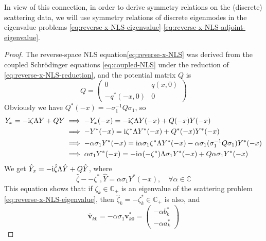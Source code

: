 In view of this connection, in order to derive symmetry relations on the (discrete) scattering data, we will use symmetry relations of discrete eigenmodes in the eigenvalue problems \eqref{eq:reverse-x-NLS-eigenvalue}-\eqref{eq:reverse-x-NLS-adjoint-eigenvalue}.
\begin{proof}
    The reverse-space NLS equation\eqref{eq:reverse-x-NLS} was derived from the coupled Schrödinger equations \eqref{eq:coupled-NLS} under the reduction of \eqref{eq:reverse-x-NLS-reduction}, and the potential matrix $ Q $ is 
    \begin{equation}
        Q = \begin{pmatrix}
            0 & q(x,0) \\
            -q^{*}(-x,0) & 0
        \end{pmatrix}
    \end{equation}
    Obviously we have $ Q^{*}(-x) = - \sigma^{-1}_{1} Q \sigma_{1} $, so
    \begin{equation}
        \begin{aligned}
            Y_{x} = - \mathrm{i} \zeta \Lambda Y + QY &\implies -Y_{x}(-x) = -\mathrm{i} \zeta \Lambda Y(-x) + Q(-x)Y(-x) \\
            &\implies -Y^{*}(-x) = \mathrm{i} \zeta^{*} \Lambda Y^{*}(-x) + Q^{*}(-x)Y^{*}(-x) \\
            &\implies - \alpha \sigma_{1}Y^{*}(-x) = \mathrm{i} \alpha \sigma_{1} \zeta^{*} \Lambda Y^{*}(-x) - \alpha \sigma_{1} (\sigma_{1}^{-1}Q\sigma_{1})Y^{*}(-x) \\ 
            &\implies \alpha \sigma_{1}Y^{*}(-x) = - \mathrm{i} \alpha (-\zeta^{*}) \Lambda \sigma_{1}Y^{*}(-x) + Q \alpha \sigma_{1}Y^{*}(-x) \\
        \end{aligned}
    \end{equation}
    We get $ \hat{Y}_{x} = - \mathrm{i} \hat{\zeta}\Lambda \hat{Y} + Q \hat{Y} $, where
    \begin{equation}
        \hat{\zeta} - - \zeta^{*}, \hat{Y} = \alpha \sigma_{1}Y^{*}(-x) , \quad \forall \alpha \in \mathbb{C} 
    \end{equation}
    This equation shows that: if $ \zeta_{k} \in \mathbb{C}_{+} $ is an eigenvalue of the scattering problem \eqref{eq:reverse-x-NLS-eigenvalue}, then $ \hat{\zeta}_{k} = - \zeta_{k}^{*} \in \mathbb{C}_{+} $ is also, and 
    \begin{equation}
        \hat{\mathbf{v}}_{k0} = -\alpha \sigma_{1}\mathbf{v}_{k0}^{*} = \begin{pmatrix}
            -\alpha b_{k}^{*} \\
            -\alpha a_{k}^{*}
        \end{pmatrix} \label{eq:reverse-x-NLS-eigenvector}
    \end{equation}


\end{proof}
